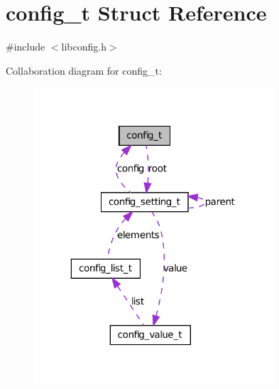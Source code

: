\hypertarget{structconfig__t}{
\section{config\_\-t Struct Reference}
\label{structconfig__t}
}


{\ttfamily \#include $<$libconfig.h$>$}



Collaboration diagram for config\_\-t:
\nopagebreak
\begin{figure}[H]
\begin{center}
\leavevmode
\includegraphics[width=253pt]{structconfig__t__coll__graph}
\end{center}
\end{figure}
